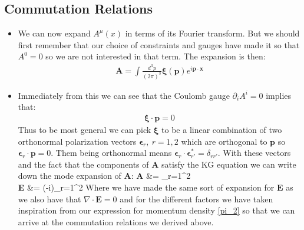 \documentclass[11pt]{article}
\renewenvironment{flalign}{\vspace{-2mm}\empheq[box=\tcbhighmath]{align}}{\endempheq}
\numberwithin{equation}{section}
\begin{document}
\subsection{Commutation Relations} %
\label{sub:commutation_relations}
\begin{itemize}
  \item We can now expand $A^{\mu}(x)$ in terms of its Fourier transform. But we should first remember that our choice of constraints and gauges have made it so that $A^0=0$ so we are not interested in that term. The expansion is then:
    \begin{align*}
      \textbf{A} = \int \frac{d^3p}{(2\pi)^3}\boldsymbol{\xi}(\textbf{p})e^{i\textbf{p}\cdot\textbf{x}}
    \end{align*}
    \item Immediately from this we can see that the Coulomb gauge $\partial_iA^i =0 $ implies that:
    \begin{align*}
       \boldsymbol{\xi}\cdot\textbf{p} =0
     \end{align*} 
     Thus to be most general we can pick $\boldsymbol{\xi}$ to be a linear combination of two orthonormal polarization vectors $\boldsymbol{\epsilon}_{r},~r=1,2$ which are orthogonal to $\textbf{p}$ so $\boldsymbol{\epsilon}_{r}\cdot \textbf{p}=0$. Them being orthonormal means $\boldsymbol{\epsilon}_{r}\cdot\boldsymbol{\epsilon}^{\ast}_{r'} = \delta_{rr'}$. With these vectors and the fact that the components of $\textbf{A}$ satisfy the KG equation we can write down the mode expansion of $\textbf{A}$:
     \begin{flalign}
     \label{A_&_E}
       \textbf{A} &= \int {}\sum_{r=1}^2 \\
       \textbf{E}  &= \int {}(-i)\sum_{r=1}^2
     \end{flalign}
     Where we have made the same sort of expansion for $ \textbf{E}$ as we also have that $ \nabla \cdot \textbf{E} =0$ and for the different factors we have taken inspiration from our expression for momentum density \ref{pi_2} so that we can arrive at the commutation relations we derived above. 


\end{itemize}
\end{document}
